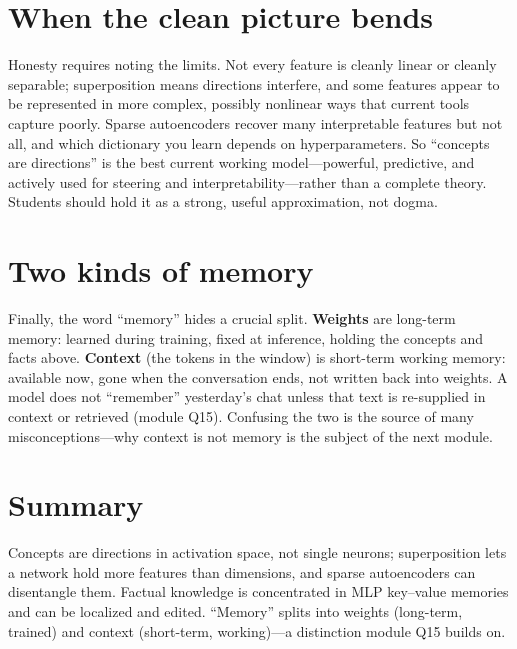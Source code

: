 \documentclass[11pt]{article}
\begin{document}
\section{When the clean picture bends}
Honesty requires noting the limits. Not every feature is cleanly linear or cleanly separable; superposition
means directions interfere, and some features appear to be represented in more complex, possibly nonlinear
ways that current tools capture poorly. Sparse autoencoders recover many interpretable features but not all,
and which dictionary you learn depends on hyperparameters. So ``concepts are directions'' is the best
current working model---powerful, predictive, and actively used for steering and interpretability---rather
than a complete theory. Students should hold it as a strong, useful approximation, not dogma.

\section{Two kinds of memory}
Finally, the word ``memory'' hides a crucial split. \textbf{Weights} are long-term memory: learned during
training, fixed at inference, holding the concepts and facts above. \textbf{Context} (the tokens in the
window) is short-term working memory: available now, gone when the conversation ends, not written back into
weights. A model does not ``remember'' yesterday's chat unless that text is re-supplied in context or
retrieved (module Q15). Confusing the two is the source of many misconceptions---why context is not memory
is the subject of the next module.

\section{Summary}
Concepts are directions in activation space, not single neurons; superposition lets a network hold more
features than dimensions, and sparse autoencoders can disentangle them. Factual knowledge is concentrated
in MLP key--value memories and can be localized and edited. ``Memory'' splits into weights (long-term,
trained) and context (short-term, working)---a distinction module Q15 builds on.



\end{document}
